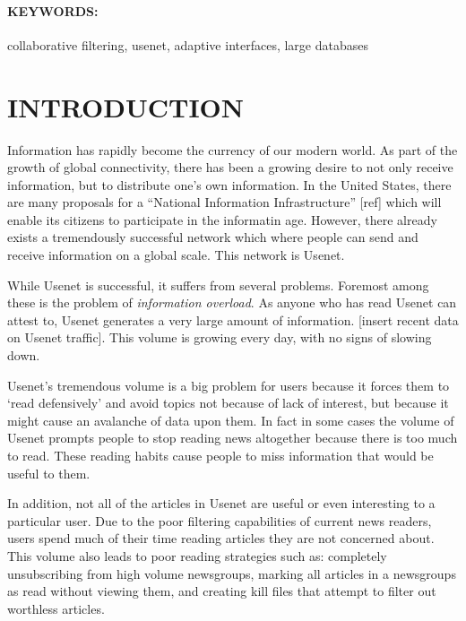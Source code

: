 \paragraph{KEYWORDS:}
collaborative filtering, usenet, adaptive interfaces, large databases

\section {INTRODUCTION}
\label{sec:introduction}

  
Information has rapidly become the currency of our modern world. As part of the
growth of global connectivity, there has been a growing desire to not only
receive information, but to distribute one's own information. In the United
States, there are many proposals for a ``National Information Infrastructure''
[ref] which will enable its citizens to participate in the informatin age.
However, there already exists a tremendously successful network which where
people can send and receive information on a global scale. This network is
Usenet.
  
While Usenet is successful, it suffers from several problems. Foremost
among these is the problem of {\em information overload}. As anyone who has
read Usenet can attest to, Usenet generates a very large amount of
information. [insert recent data on Usenet traffic]. This volume is growing
every day, with no signs of slowing down.
  
Usenet's tremendous volume is a big problem for users because it forces
them to `read defensively' and avoid topics not because of lack of
interest, but because it might cause an avalanche of data upon them. In
fact in some cases the volume of Usenet prompts people to stop reading news
altogether because there is too much to read. These reading habits cause
people to miss information that would be useful to them.
  
In addition, not all of the articles in Usenet are useful or even
interesting to a particular user. Due to the poor filtering capabilities of
current news readers, users spend much of their time reading articles they
are not concerned about. This volume also leads to poor reading strategies
such as: completely unsubscribing from high volume newsgroups, marking all
articles in a newsgroups as read without viewing them, and creating kill
files that attempt to filter out worthless articles.
  
